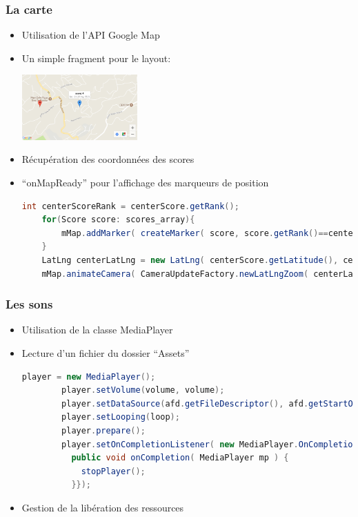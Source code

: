 \documentclass[handout]{beamer}
\begin{document}
\begin{frame}[fragile]
  \frametitle<1->{La carte} %
    \begin{itemize}
    \item <1->{Utilisation de l'API Google Map}%
    \item <2->{Un simple fragment pour le layout:}
    \begin{center}
      \includegraphics[height=25mm]{map_marker.png}
    \end{center}
    \item <3->{Récupération des coordonnées des scores}
    \item <4->{\enquote{onMapReady} pour l'affichage des marqueurs de position}
    \begin{lstlisting}[language=java]
    int centerScoreRank = centerScore.getRank();
    for(Score score: scores_array){
        mMap.addMarker( createMarker( score, score.getRank()==centerScoreRank ) );
    }
    LatLng centerLatLng = new LatLng( centerScore.getLatitude(), centerScore.getLongitude() );
    mMap.animateCamera( CameraUpdateFactory.newLatLngZoom( centerLatLng, 11 ) );
    \end{lstlisting} %
    \end{itemize}
\end{frame}

\begin{frame}[fragile]
  \frametitle<1->{Les sons}
    \begin{itemize}%
    \item <1->{Utilisation de la classe MediaPlayer}%
    \item <2->{Lecture d'un fichier du dossier \enquote{Assets}}%
      \begin{lstlisting}[language=java]
        player = new MediaPlayer();
        player.setVolume(volume, volume);
        player.setDataSource(afd.getFileDescriptor(), afd.getStartOffset(), afd.getLength());
        player.setLooping(loop);
        player.prepare();
        player.setOnCompletionListener( new MediaPlayer.OnCompletionListener() {
          public void onCompletion( MediaPlayer mp ) {
            stopPlayer();
          }});
      \end{lstlisting} %
    \item <2->{Gestion de la libération des ressources} %
   \end{itemize}
\end{frame}
\end{document}
